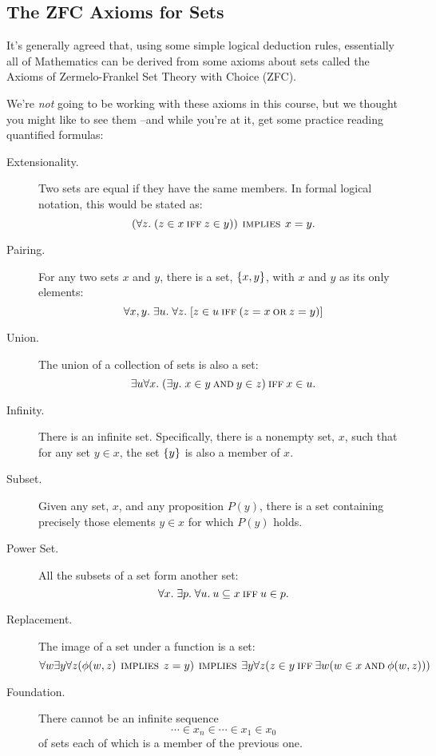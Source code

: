 \subsection{The ZFC Axioms for Sets}
It's generally agreed that, using some simple logical deduction rules,
essentially all of Mathematics can be derived from some axioms about sets
called the Axioms of Zermelo-Frankel Set Theory with Choice (ZFC).

We're \textit{not} going to be working with these axioms in this course,
but we thought you might like to see them --and while you're at it, get
some practice reading quantified formulas:
%

\begin{description}

\item[Extensionality.] Two sets are equal if they have the same members.
In formal logical notation, this would be stated as:
\[
(\forall z.\; (z \in x \mathbin{\mathrm{\textsc{iff}}} z \in y)) \mathbin{\mathrm{\textsc{\,implies\,}}} x = y.
\]


\item[Pairing.] For any two sets $x$ and $y$, there is a set,
     $\left\{x,y\right\}$, with $x$ and $y$ as its only elements:
\[
\forall x,y.\; \exists u.\; \forall z.\;
[z \in u \mathbin{\mathrm{\textsc{iff}}} (z = x \mathbin{\mathrm{\textsc{or}}} z = y)]
\]

\item[Union.] The union of a collection of sets is also a set:
\[
\exists u \forall x.\; (\exists y.\; x \in y \mathbin{\mathrm{\textsc{and}}} y \in z) \mathbin{\mathrm{\textsc{iff}}} x \in u.
\]

\item[Infinity.]  There is an infinite set.  Specifically, there is a
  nonempty set, $x$, such that for any set $y \in x$, the set $\left\{y\right\}$ is
  also a member of $x$.

\item[Subset.] Given any set, $x$, and any proposition $P(y)$, there is a
  set containing precisely those elements $y \in x$ for which $P(y)$ holds.

\item[Power Set.]  All the subsets of a set form another set:
\[
\forall x.\; \exists p.\; \forall u.\: u \subseteq x \mathbin{\mathrm{\textsc{iff}}} u \in p.
\]

\item[Replacement.]  The image of a set under a function is a set:
\[
\forall w \exists y \forall z (\phi(w,z) \mathbin{\mathrm{\textsc{\,implies\,}}} z = y)
        \mathbin{\mathrm{\textsc{\,implies\,}}} \exists y \forall z (
            z \in y \mathbin{\mathrm{\textsc{iff}}} \exists w (w \in x \mathbin{\mathrm{\textsc{and}}} \phi(w,z)))
\]

\item[Foundation.] 
There cannot be an infinite sequence
\[
\cdots \in x_n \in \cdots \in x_1 \in x_0
\]
of sets each of which is a member of the previous one.


\end{description}
